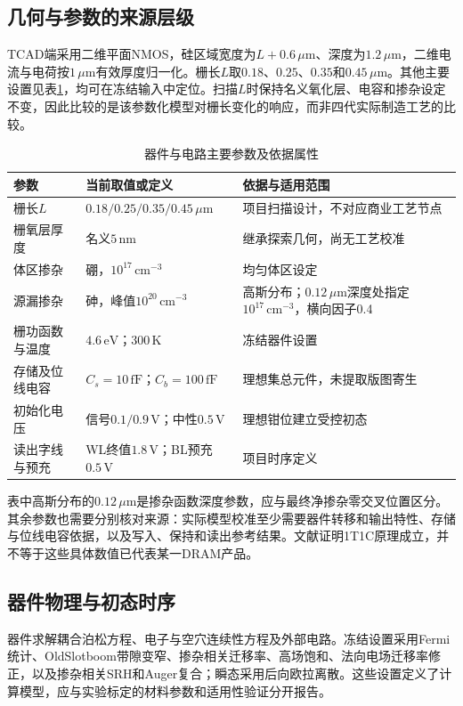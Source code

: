 \documentclass[UTF8,a4paper,zihao=-4,fontset=fandol]{ctexart}
\newcommand{\um}{\,\mu\mathrm{m}}
\newcommand{\V}{\,\mathrm{V}}
\begin{document}
\subsection{几何与参数的来源层级}
TCAD端采用二维平面NMOS，硅区域宽度为$L+0.6\um$、深度为$1.2\um$，二维电流与电荷按$1\um$有效厚度归一化。栅长$L$取$0.18$、$0.25$、$0.35$和$0.45\um$。其他主要设置见表\ref{tab:params}，均可在冻结输入中定位\cite{v3design}。扫描$L$时保持名义氧化层、电容和掺杂设定不变，因此比较的是该参数化模型对栅长变化的响应，而非四代实际制造工艺的比较。

\begin{table}[htbp]
\centering\small
\caption{器件与电路主要参数及依据属性}
\label{tab:params}
\begin{tabularx}{\textwidth}{@{}p{3.2cm}p{4.5cm}X@{}}
\toprule
参数 & 当前取值或定义 & 依据与适用范围\\
\midrule
栅长$L$ & $0.18/0.25/0.35/0.45\um$ & 项目扫描设计，不对应商业工艺节点\\
栅氧层厚度 & 名义$5\,\mathrm{nm}$ & 继承探索几何，尚无工艺校准\\
体区掺杂 & 硼，$10^{17}\,\mathrm{cm}^{-3}$ & 均匀体区设定\\
源漏掺杂 & 砷，峰值$10^{20}\,\mathrm{cm}^{-3}$ & 高斯分布；$0.12\um$深度处指定$10^{17}\,\mathrm{cm}^{-3}$，横向因子0.4\\
栅功函数与温度 & $4.6\,\mathrm{eV}$；$300\,\mathrm{K}$ & 冻结器件设置\\
存储及位线电容 & $C_s=10\,\mathrm{fF}$；$C_b=100\,\mathrm{fF}$ & 理想集总元件，未提取版图寄生\\
初始化电压 & 信号$0.1/0.9\V$；中性$0.5\V$ & 理想钳位建立受控初态\\
读出字线与预充 & WL终值$1.8\V$；BL预充$0.5\V$ & 项目时序定义\\
\bottomrule
\end{tabularx}
\end{table}

表中高斯分布的$0.12\um$是掺杂函数深度参数，应与最终净掺杂零交叉位置区分。其余参数也需要分别核对来源：实际模型校准至少需要器件转移和输出特性、存储与位线电容依据，以及写入、保持和读出参考结果。文献证明1T1C原理成立，并不等于这些具体数值已代表某一DRAM产品。

\subsection{器件物理与初态时序}
器件求解耦合泊松方程、电子与空穴连续性方程及外部电路。冻结设置采用Fermi统计、OldSlotboom带隙变窄、掺杂相关迁移率、高场饱和、法向电场迁移率修正，以及掺杂相关SRH和Auger复合；瞬态采用后向欧拉离散\cite{v3design}。这些设置定义了计算模型，应与实验标定的材料参数和适用性验证分开报告。
\end{document}

